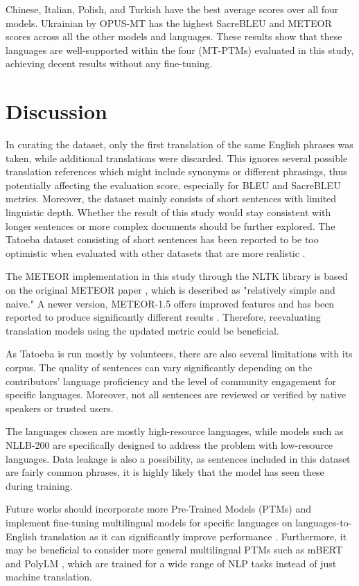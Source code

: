 \documentclass[a4paper, 11pt]{article}
\begin{document}
Chinese, Italian, Polish, and Turkish have the best average scores over all four models. Ukrainian by OPUS-MT has the highest SacreBLEU and METEOR scores across all the other models and languages. These results show that these languages are well-supported within the four (MT-PTMs) evaluated in this study, achieving decent results without any fine-tuning.

\section{Discussion}

In curating the dataset, only the first translation of the same English phrases was taken, while additional translations were discarded. This ignores several possible translation references which might include synonyms or different phrasings, thus potentially affecting the evaluation score, especially for BLEU and SacreBLEU metrics. Moreover, the dataset mainly consists of short sentences with limited linguistic depth. Whether the result of this study would stay consistent with longer sentences or more complex documents should be further explored. The Tatoeba dataset \cite{tiedemann-2020-tatoeba-challenge} consisting of short sentences has been reported to be too optimistic when evaluated with other datasets that are more realistic \cite{tiedemann-2020-opus-mt}.

The METEOR implementation in this study through the NLTK library is based on the original METEOR paper \cite{lavie-2007-meteor}, which is described as "relatively simple and naive." A newer version, METEOR-1.5 \cite{denkowski-lavie-2014-meteor-universal} offers improved features and has been reported to produce significantly different results \cite{tuetschek-2021-meteor-issue-nltk}. Therefore, reevaluating translation models using the updated metric could be beneficial.

As Tatoeba \cite{tatoeba} is run mostly by volunteers, there are also several limitations with its corpus. The quality of sentences can vary significantly depending on the contributors' language proficiency and the level of community engagement for specific languages. Moreover, not all sentences are reviewed or verified by native speakers or trusted users.

The languages chosen are mostly high-resource languages, while models such as NLLB-200 \cite{nllb200-2020} are specifically designed to address the problem with low-resource languages. Data leakage is also a possibility, as sentences included in this dataset are fairly common phrases, it is highly likely that the model has seen these during training.

Future works should incorporate more Pre-Trained Models (PTMs) and implement fine-tuning multilingual models for specific languages on languages-to-English translation as it can significantly improve performance \cite{zhang-2023-fine-tuning}. Furthermore, it may be beneficial to consider more general multilingual PTMs such as mBERT \cite{wu-2020-mbert-are-all} and PolyLM \cite{wei-2023-polylm}, which are trained for a wide range of NLP tasks instead of just machine translation.

\printbibliography
\end{document}
